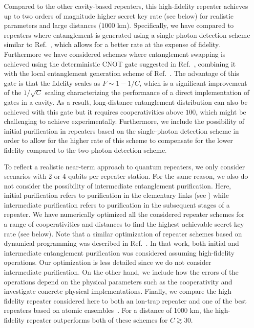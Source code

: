 Compared to the other cavity-based repeaters, this high-fidelity repeater
achieves up to two orders of magnitude higher secret key rate (see below) for
realistic parameters and large distances ($1000$ km). Specifically, we have
compared to repeaters where entanglement is generated using a single-photon
detection scheme similar to Ref.~\cite{huelga}, which allows for a better rate
at the expense of fidelity. Furthermore we have considered schemes where
entanglement swapping is achieved using the deterministic CNOT gate suggested in
Ref.~\cite{Anders2prl}, combining it with the local entanglement generation
scheme of Ref.~\cite{Anders1prl}. The advantage of this gate is that the
fidelity scales as $F\sim1-1/C$, which is a significant improvement of the
$1/\sqrt{C}$ scaling characterizing the performance of a direct implementation
of gates in a cavity. As a result, long-distance entanglement distribution can
also be achieved with this gate but it requires cooperativities above $100$,
which might be challenging to achieve experimentally. Furthermore, we include
the possibility of initial purification in repeaters based on the single-photon
detection scheme in order to allow for the higher rate of this scheme to
compensate for the lower fidelity compared to the two-photon detection scheme.

To reflect a realistic near-term approach to quantum repeaters, we only consider
scenarios with 2 or 4 qubits per repeater station. For the same reason, we also
do not consider the possibility of intermediate entanglement purification. Here,
initial purification refers to purification in the elementary links (see
) while intermediate purification refers to purification in
the subsequent stages of a repeater. We have numerically optimized all the
considered repeater schemes for a range of cooperativities and distances to find
the highest achievable secret key rate (see below). Note that a similar
optimization of repeater schemes based on dynamical programming was described in
Ref.~\cite{jiang2007}. In that work, both initial and intermediate entanglement
purification was considered assuming high-fidelity operations.  Our optimization
is less detailed since we do not consider intermediate purification. On the
other hand, we include how the errors of the operations depend on the physical
parameters such as the cooperativity and investigate concrete physical
implementations.
Finally, we compare the high-fidelity repeater considered here to both an
ion-trap repeater and one of the best repeaters based on atomic
ensembles~\cite{sangouard3}. For a distance of 1000 km, the high-fidelity
repeater outperforms both of these schemes for $C\gtrsim30$.

